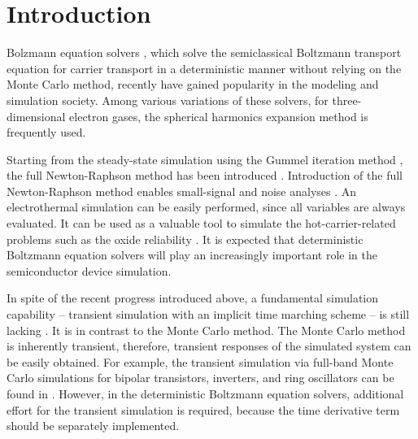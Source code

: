 \documentclass[journal]{IEEEtran}
\newcommand{\revision}[1]{{#1}}
\begin{document}
%
\IEEEpeerreviewmaketitle


\section{Introduction}

    Bolzmann equation solvers 
\cite{Gnudi1993,Hennacy1995,Jungemann2006,Jin2008,Hong2009,Hong2011,Ruic2015}, which solve the semiclassical Boltzmann transport equation for carrier transport in a deterministic manner without relying on the Monte Carlo method,
recently have gained popularity in the modeling and simulation society.
   Among various variations of these solvers, for three-dimensional electron gases, the spherical harmonics expansion method is frequently used. 

   Starting from the steady-state simulation using the Gummel iteration method \cite{Gnudi1993}, the full Newton-Raphson method has been introduced \cite{Hong2009, Ruic2015}.
   Introduction of the full Newton-Raphson method enables 
small-signal and noise analyses \cite{Hong2009, Ruic2015}.
   An electrothermal simulation \cite{Kamrani2017} can be easily performed, since all variables are always evaluated.
   It can be used as a valuable tool to simulate the hot-carrier-related problems such as the oxide reliability \cite{Bina2014,Kamrani2017a}.  
   It is expected that deterministic Boltzmann equation solvers will play an increasingly important role in the semiconductor device simulation. 
           
\revision{In spite of the recent progress introduced above, 
a fundamental simulation capability -- transient simulation with an implicit time marching scheme -- is still lacking \cite{Rupp2016}.
   It is in contrast to the Monte Carlo method.
   The Monte Carlo method is inherently transient, therefore, transient responses of the simulated system can be easily obtained. 
   For example, the transient simulation via full-band Monte Carlo simulations for bipolar transistors, inverters, and ring oscillators can be found in \cite{Tiwari1990,Laux1997}.
   However, in the deterministic Boltzmann equation solvers, 
additional effort for the transient simulation is required, because the time derivative term should be separately implemented.}
    
\end{document}
